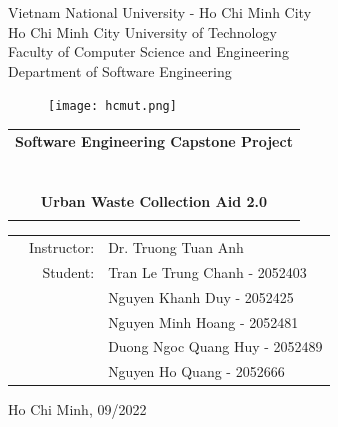 \documentclass[a4paper, 13pt]{article}
\begin{document}
\begin{titlepage}
\begin{center}
Vietnam National University - Ho Chi Minh City \\
Ho Chi Minh City University of Technology \\
Faculty of Computer Science and Engineering \\
Department of Software Engineering 
\end{center}

\vspace{1cm}

\begin{figure}[h!]
\begin{center}
\texttt{[image: hcmut.png]}
\end{center}
\end{figure}

\vspace{1cm}


\begin{center}
\begin{tabular}{c}
	\multicolumn{1}{l}{\textbf{{\Large Software Engineering Capstone Project }}}\\
	~~\\
	\hline
	\\
	\\
	
	\textbf{{\Huge Urban Waste Collection Aid 2.0}}\\
	\\
	\hline
\end{tabular}
\end{center}

\vspace{3cm}

\begin{table}[h]
\begin{tabular}{rrl}
\hspace{5 cm} & Instructor: &Dr. Truong Tuan Anh\\
& Student: & Tran Le Trung Chanh - 2052403\\
& &  Nguyen Khanh Duy  - 2052425\\
& & Nguyen Minh Hoang - 2052481\\
& & Duong Ngoc Quang Huy - 2052489\\
& & Nguyen Ho Quang - 2052666\\
\end{tabular}
\end{table}

\begin{center}
{\footnotesize Ho Chi Minh, 09/2022}
\end{center}
\end{titlepage}
\onehalfspacing
\tableofcontents
\newpage
\listoffigures
\newpage
\listoftables
\newpage
\end{document}
